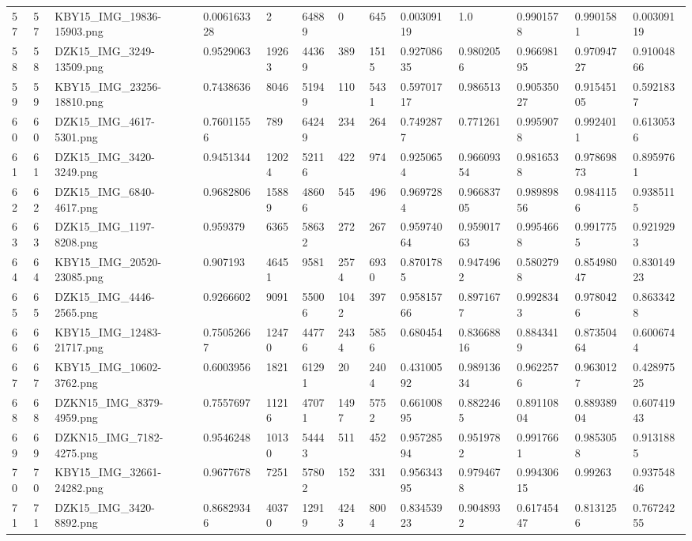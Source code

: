 \documentclass[11pt, a4paper, twoside]{report}
\begin{document}
\begin{longtable}[c]{@{}lllllllllllll@{}}
57 & 57 & KBY15\_IMG\_19836-15903.png & 0.006163328 & 2 & 64889 & 0 & 645 & 0.00309119 & 1.0 & 0.9901578 & 0.9901581 & 0.00309119 \\
58 & 58 & DZK15\_IMG\_3249-13509.png & 0.9529063 & 19263 & 44369 & 389 & 1515 & 0.92708635 & 0.9802056 & 0.96698195 & 0.97094727 & 0.91004866 \\
59 & 59 & KBY15\_IMG\_23256-18810.png & 0.7438636 & 8046 & 51949 & 110 & 5431 & 0.59701717 & 0.986513 & 0.90535027 & 0.91545105 & 0.5921837 \\
60 & 60 & DZK15\_IMG\_4617-5301.png & 0.76011556 & 789 & 64249 & 234 & 264 & 0.7492877 & 0.771261 & 0.9959078 & 0.9924011 & 0.6130536 \\
61 & 61 & DZK15\_IMG\_3420-3249.png & 0.9451344 & 12024 & 52116 & 422 & 974 & 0.9250654 & 0.96609354 & 0.9816538 & 0.97869873 & 0.8959761 \\
62 & 62 & DZK15\_IMG\_6840-4617.png & 0.9682806 & 15889 & 48606 & 545 & 496 & 0.9697284 & 0.96683705 & 0.98989856 & 0.9841156 & 0.9385115 \\
63 & 63 & DZK15\_IMG\_1197-8208.png & 0.959379 & 6365 & 58632 & 272 & 267 & 0.95974064 & 0.95901763 & 0.9954668 & 0.9917755 & 0.9219293 \\
64 & 64 & KBY15\_IMG\_20520-23085.png & 0.907193 & 46451 & 9581 & 2574 & 6930 & 0.8701785 & 0.9474962 & 0.5802798 & 0.85498047 & 0.83014923 \\
65 & 65 & DZK15\_IMG\_4446-2565.png & 0.9266602 & 9091 & 55006 & 1042 & 397 & 0.95815766 & 0.8971677 & 0.9928343 & 0.9780426 & 0.8633428 \\
66 & 66 & KBY15\_IMG\_12483-21717.png & 0.75052667 & 12470 & 44776 & 2434 & 5856 & 0.680454 & 0.83668816 & 0.8843419 & 0.87350464 & 0.6006744 \\
67 & 67 & KBY15\_IMG\_10602-3762.png & 0.6003956 & 1821 & 61291 & 20 & 2404 & 0.43100592 & 0.98913634 & 0.9622576 & 0.9630127 & 0.42897525 \\
68 & 68 & DZKN15\_IMG\_8379-4959.png & 0.7557697 & 11216 & 47071 & 1497 & 5752 & 0.66100895 & 0.8822465 & 0.89110804 & 0.88938904 & 0.60741943 \\
69 & 69 & DZKN15\_IMG\_7182-4275.png & 0.9546248 & 10130 & 54443 & 511 & 452 & 0.95728594 & 0.9519782 & 0.9917661 & 0.9853058 & 0.9131885 \\
70 & 70 & KBY15\_IMG\_32661-24282.png & 0.9677678 & 7251 & 57802 & 152 & 331 & 0.95634395 & 0.9794678 & 0.99430615 & 0.99263 & 0.93754846 \\
71 & 71 & DZK15\_IMG\_3420-8892.png & 0.86829346 & 40370 & 12919 & 4243 & 8004 & 0.83453923 & 0.9048932 & 0.61745447 & 0.8131256 & 0.76724255 \\

\end{longtable}
\end{document}
